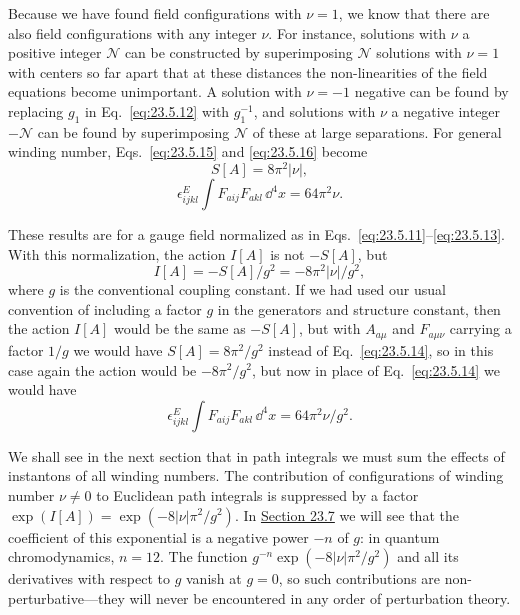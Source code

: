 Because we have found field configurations with $\nu=1$, we know that
there are also field configurations with any integer $\nu$. For instance,
solutions with $\nu$ a positive integer $\mathcal N$ can be constructed
by superimposing $\mathcal N$ solutions with $\nu=1$ with centers so far
apart that at these distances the non-linearities of the field equations
become unimportant. A solution with $\nu=-1$ negative can be found by
replacing $g_1$ in Eq.~\eqref{eq:23.5.12} with $g_1^{-1}$, and solutions
with $\nu$ a negative integer $-\mathcal N$ can be found by
superimposing $\mathcal N$ of these at large separations. For general
winding number, Eqs.~\eqref{eq:23.5.15} and \eqref{eq:23.5.16} become
\begin{equation}
S[A]=8\pi^2|\nu|,
\tag{23.5.17}\label{eq:23.5.17}
\end{equation}
\begin{equation}
\epsilon^E_{ijkl}\int F_{a ij}F_{a kl}\,\dd^4x=64\pi^2\nu.
\tag{23.5.18}\label{eq:23.5.18}
\end{equation}

These results are for a gauge field normalized as in
Eqs.~\eqref{eq:23.5.11}--\eqref{eq:23.5.13}. With this normalization,
the action $I[A]$ is not $-S[A]$, but
\begin{equation}
I[A]=-S[A]/g^2=-8\pi^2|\nu|/g^2,
\tag{23.5.19}\label{eq:23.5.19}
\end{equation}
where $g$ is the conventional coupling constant. If we had used our usual
convention of including a factor $g$ in the generators and structure
constant, then the action $I[A]$ would be the same as $-S[A]$, but with
$A_{a\mu}$ and $F_{a\mu\nu}$ carrying a factor $1/g$ we would
have $S[A]=8\pi^2/g^2$ instead of Eq.~\eqref{eq:23.5.14}, so in this
case again the action would be $-8\pi^2/g^2$, but now in place of
Eq.~\eqref{eq:23.5.14} we would have
\begin{equation}
\epsilon^E_{ijkl}\int F_{a ij}F_{a kl}\,\dd^4x
=64\pi^2\nu/g^2.
\tag{23.5.20}\label{eq:23.5.20}
\end{equation}

We shall see in the next section that in path integrals we must sum the
effects of instantons of all winding numbers. The contribution of
configurations of winding number $\nu\ne0$ to Euclidean path integrals is
suppressed by a factor
$\exp(I[A])=\exp(-8|\nu|\pi^2/g^2)$. In \hyperref[sec:23.7]{Section 23.7} we will see that
the coefficient of this exponential is a negative power $-n$ of $g$: in
quantum chromodynamics, $n=12$. The function
$g^{-n}\exp(-8|\nu|\pi^2/g^2)$ and all its derivatives with respect to
$g$ vanish at $g=0$, so such contributions are non-perturbative---they
will never be encountered in any order of perturbation theory.

